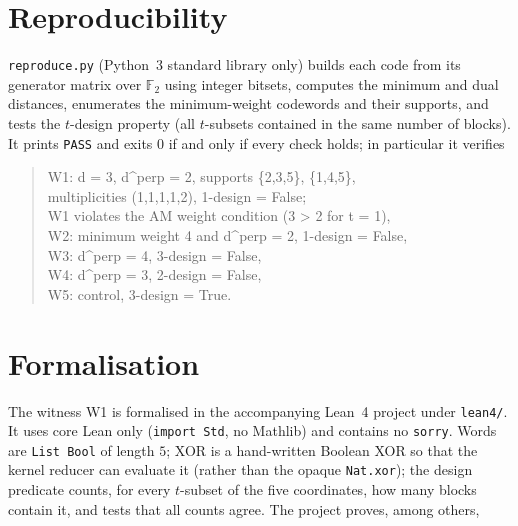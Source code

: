 \documentclass[11pt]{article}
\theoremstyle{definition}
\theoremstyle{remark}
\newcommand{\F}{\mathbb{F}}
\begin{document}
\section{Reproducibility}

\texttt{reproduce.py} (Python~3 standard library only) builds each code from
its generator matrix over $\F_2$ using integer bitsets, computes the minimum
and dual distances, enumerates the minimum-weight codewords and their supports,
and tests the $t$-design property (all $t$-subsets contained in the same number
of blocks). It prints \texttt{PASS} and exits $0$ if and only if every check
holds; in particular it verifies

\begin{quote}\ttfamily
W1: d = 3, d\^{}perp = 2, supports \{2,3,5\}, \{1,4,5\},\\
\hspace*{1.2em} multiplicities (1,1,1,1,2), 1-design = False;\\
W1 violates the AM weight condition (3 > 2 for t = 1),\\
W2: minimum weight 4 and d\^{}perp = 2, 1-design = False,\\
W3: d\^{}perp = 4, 3-design = False,\\
W4: d\^{}perp = 3, 2-design = False,\\
W5: control, 3-design = True.
\end{quote}

\section{Formalisation}

The witness W1 is formalised in the accompanying Lean~4 project under
\texttt{lean4/}. It uses core Lean only (\texttt{import Std}, no Mathlib) and
contains no \texttt{sorry}. Words are \texttt{List Bool} of length $5$; XOR is a
hand-written Boolean XOR so that the kernel reducer can evaluate it (rather than
the opaque \texttt{Nat.xor}); the design predicate counts, for every $t$-subset
of the five coordinates, how many blocks contain it, and tests that all counts
agree. The project proves, among others,
\end{document}
